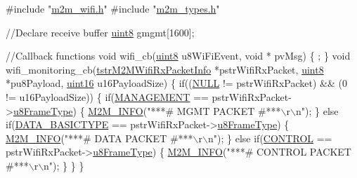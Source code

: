 \begin{DoxyCode}
\textcolor{preprocessor}{#include "\hyperlink{m2m__wifi_8h}{m2m\_wifi.h}"}
\textcolor{preprocessor}{#include "\hyperlink{m2m__types_8h}{m2m\_types.h}"}

\textcolor{comment}{//Declare receive buffer }
\hyperlink{group__DataT_ga4df709a77647e870bbf1d955b8edc9a6}{uint8} gmgmt[1600];

\textcolor{comment}{//Callback functions}
\textcolor{keywordtype}{void} wifi\_cb(\hyperlink{group__DataT_ga4df709a77647e870bbf1d955b8edc9a6}{uint8} u8WiFiEvent, \textcolor{keywordtype}{void} * pvMsg)
\{
    ; 
\}
\textcolor{keywordtype}{void} wifi\_monitoring\_cb(\hyperlink{structtstrM2MWifiRxPacketInfo}{tstrM2MWifiRxPacketInfo} *pstrWifiRxPacket, 
      \hyperlink{group__DataT_ga4df709a77647e870bbf1d955b8edc9a6}{uint8} *pu8Payload, \hyperlink{group__DataT_ga1daa745171fc6e31d942c161422a76f9}{uint16} u16PayloadSize)
\{
    \textcolor{keywordflow}{if}((\hyperlink{group__BSPDefine_ga070d2ce7b6bb7e5c05602aa8c308d0c4}{NULL} != pstrWifiRxPacket) && (0 != u16PayloadSize)) \{
        \textcolor{keywordflow}{if}(\hyperlink{group__WlanEnums_gga593eb9b713b71fcc9cae6e81393b40d9a6882ae19eda3dcf275595670d49d709e}{MANAGEMENT} == pstrWifiRxPacket->\hyperlink{structtstrM2MWifiRxPacketInfo_a15d2ea32b15af3afadecf6487bb0d086}{u8FrameType}) \{
            \hyperlink{nm__common_8h_a84108eca2655e811179386a39c62acf2}{M2M\_INFO}(\textcolor{stringliteral}{"***# MGMT PACKET #***\(\backslash\)r\(\backslash\)n"});
        \} \textcolor{keywordflow}{else} \textcolor{keywordflow}{if}(\hyperlink{group__WlanEnums_gga593eb9b713b71fcc9cae6e81393b40d9a297b5ad5452f3000106b51741f65aee9}{DATA\_BASICTYPE} == pstrWifiRxPacket->\hyperlink{structtstrM2MWifiRxPacketInfo_a15d2ea32b15af3afadecf6487bb0d086}{u8FrameType}) \{
            \hyperlink{nm__common_8h_a84108eca2655e811179386a39c62acf2}{M2M\_INFO}(\textcolor{stringliteral}{"***# DATA PACKET #***\(\backslash\)r\(\backslash\)n"});
        \} \textcolor{keywordflow}{else} \textcolor{keywordflow}{if}(\hyperlink{group__WlanEnums_gga593eb9b713b71fcc9cae6e81393b40d9af722a5faa36087c914da53ebe4711f08}{CONTROL} == pstrWifiRxPacket->\hyperlink{structtstrM2MWifiRxPacketInfo_a15d2ea32b15af3afadecf6487bb0d086}{u8FrameType}) \{
            \hyperlink{nm__common_8h_a84108eca2655e811179386a39c62acf2}{M2M\_INFO}(\textcolor{stringliteral}{"***# CONTROL PACKET #***\(\backslash\)r\(\backslash\)n"});
        \}
    \}
\}


\end{DoxyCode}
